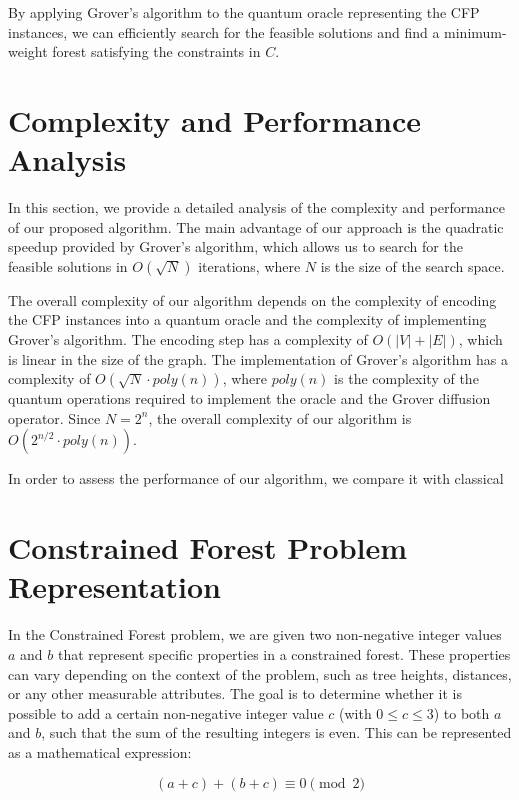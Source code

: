 By applying Grover's algorithm to the quantum oracle representing the CFP instances, we can efficiently search for the feasible solutions and find a minimum-weight forest satisfying the constraints in $C$.

\section{Complexity and Performance Analysis} \label{section_analysis}

In this section, we provide a detailed analysis of the complexity and performance of our proposed algorithm. The main advantage of our approach is the quadratic speedup provided by Grover's algorithm, which allows us to search for the feasible solutions in $O(\sqrt{N})$ iterations, where $N$ is the size of the search space.

The overall complexity of our algorithm depends on the complexity of encoding the CFP instances into a quantum oracle and the complexity of implementing Grover's algorithm. The encoding step has a complexity of $O(|V| + |E|)$, which is linear in the size of the graph. The implementation of Grover's algorithm has a complexity of $O(\sqrt{N} \cdot poly(n))$, where $poly(n)$ is the complexity of the quantum operations required to implement the oracle and the Grover diffusion operator. Since $N = 2^n$, the overall complexity of our algorithm is $O(2^{n/2} \cdot poly(n))$.

In order to assess the performance of our algorithm, we compare it with classical

\section{Constrained Forest Problem Representation}

In the Constrained Forest problem, we are given two non-negative integer values $a$ and $b$ that represent specific properties in a constrained forest. These properties can vary depending on the context of the problem, such as tree heights, distances, or any other measurable attributes. The goal is to determine whether it is possible to add a certain non-negative integer value $c$ (with $0 \leq c \leq 3$) to both $a$ and $b$, such that the sum of the resulting integers is even. This can be represented as a mathematical expression:

\begin{equation}
(a + c) + (b + c) \equiv 0 \pmod{2}
\end{equation}

